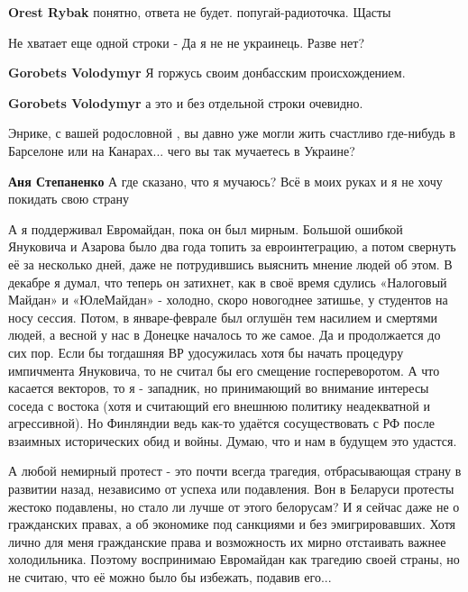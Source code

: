 \begin{itemize}
\begin{itemize}
\textbf{Orest Rybak} понятно, ответа не будет. попугай-радиоточка.
Щасты

\end{itemize} %

Не хватает еще одной строки - Да я не не украинець. Разве нет?

\begin{itemize} %
\textbf{Gorobets Volodymyr} Я горжусь своим донбасским происхождением.

\textbf{Gorobets Volodymyr} а это и без отдельной строки очевидно.
\end{itemize} %


Энрике, с вашей родословной , вы давно уже могли жить счастливо где-нибудь в
Барселоне или на Канарах... чего вы так мучаетесь в Украине?

\textbf{Аня Степаненко} А где сказано, что я мучаюсь? Всё в моих руках и я не хочу покидать свою страну


А я поддерживал Евромайдан, пока он был мирным. Большой ошибкой Януковича и
Азарова было два года топить за евроинтеграцию, а потом свернуть её за
несколько дней, даже не потрудившись выяснить мнение людей об этом. В декабре я
думал, что теперь он затихнет, как в своё время сдулись «Налоговый Майдан» и
«ЮлеМайдан» - холодно, скоро новогоднее затишье, у студентов на носу сессия.
Потом, в январе-феврале был оглушён тем насилием и смертями людей, а весной у
нас в Донецке началось то же самое. Да и продолжается до сих пор. Если бы
тогдашняя ВР удосужилась хотя бы начать процедуру импичмента Януковича, то не
считал бы его смещение госпереворотом. А что касается векторов, то я -
западник, но принимающий во внимание интересы соседа с востока (хотя и
считающий его внешнюю политику неадекватной и агрессивной). Но Финляндии ведь
как-то удаётся сосуществовать с РФ после взаимных исторических обид и войны.
Думаю, что и нам в будущем это удастся. 

А любой немирный протест - это почти всегда трагедия, отбрасывающая страну в
развитии назад, независимо от успеха или подавления. Вон в Беларуси протесты
жестоко подавлены, но стало ли лучше от этого белорусам? И я сейчас даже не о
гражданских правах, а об экономике под санкциями и без эмигрировавших. Хотя
лично для меня гражданские права и возможность их мирно отстаивать важнее
холодильника. Поэтому воспринимаю Евромайдан как трагедию своей страны, но не
считаю, что её можно было бы избежать, подавив его...


\end{itemize}

